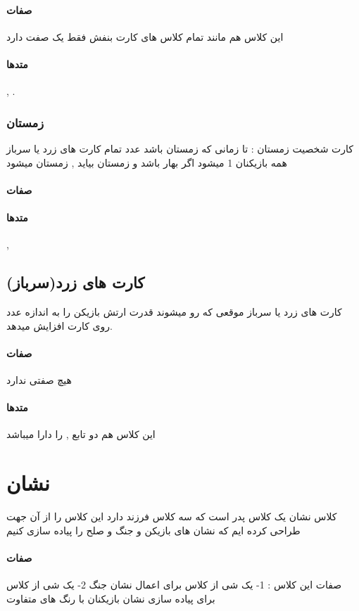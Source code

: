 \documentclass[pdf,titlepage,a4paper]{report}
\begin{document}
	\paragraph{صفات}
	این کلاس هم مانند تمام کلاس های کارت بنفش فقط یک صفت  دارد
	\paragraph{متدها}
	 ,  .
	\subsubsection{زمستان}
	کارت شخصیت زمستان : تا زمانی که زمستان باشد عدد تمام کارت های زرد یا سرباز همه بازیکنان 1 میشود اگر بهار باشد و زمستان بیاید , زمستان میشود
	\paragraph{صفات}
	\paragraph{متدها}
	 , 
	
	\subsection{کارت های زرد(سرباز)}
	کارت های زرد یا سرباز موقعی که رو میشوند قدرت ارتش بازیکن را به اندازه عدد روی کارت افزایش میدهد.

	\paragraph{صفات}
	هیچ صفتی ندارد 
	\paragraph{متدها}
	این کلاس هم دو تابع  ,  را دارا میباشد
	\newpage
	
	\section{نشان}
	کلاس نشان یک کلاس پدر است که سه کلاس فرزند دارد این کلاس را از آن جهت طراحی کرده ایم که نشان های بازیکن و جنگ و صلح را پیاده سازی کنیم
	\paragraph{صفات}
     صفات این کلاس :
	 1- یک شی از کلاس   برای اعمال نشان جنگ
	 2- یک شی از کلاس  برای پیاده سازی نشان بازیکنان با رنگ های متفاوت
\end{document}
